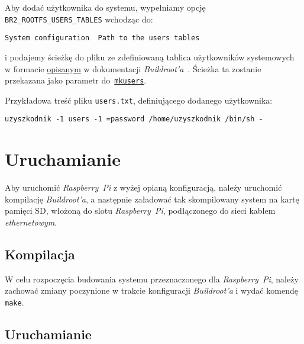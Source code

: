 \documentclass{article}
\begin{document}
Aby dodać użytkownika do systemu, wypełniamy opcję \texttt{BR2\_ROOTFS\_USERS\_TABLES} wchodząc do:

\begin{center}
\texttt{System configuration \textrightarrow\ Path to the users tables}
\end{center}

\noindent i podajemy ścieżkę do pliku ze zdefiniowaną tablica użytkowników systemowych w formacie \href{https://buildroot.org/downloads/manual/manual.html#makeuser-syntax}{opisanym} w dokumentacji \emph{Buildroot'a}~\cite{www:makeuser-syntax}. Ścieżka ta zostanie przekazana jako parametr do~\href{https://github.com/maximeh/buildroot/blob/master/support/scripts/mkusers}{\texttt{mkusers}}.

\noindent Przykładowa treść pliku \texttt{users.txt}, definiującego dodanego użytkownika:

\begin{Verbatim}[frame=single]
uzyszkodnik -1 users -1 =password /home/uzyszkodnik /bin/sh -
\end{Verbatim}


\section{Uruchamianie}

Aby uruchomić \emph{Raspberry~Pi} z wyżej opianą konfiguracją, należy uruchomić kompilację \emph{Buildroot'a}, a następnie załadować tak skompilowany system na kartę pamięci SD, włożoną do slotu \emph{Raspberry~Pi}, podłączonego do sieci kablem \emph{ethernetowym}.

\subsection{Kompilacja}

W celu rozpoczęcia budowania systemu przeznaczonego dla \emph{Raspberry~Pi}, należy zachować zmiany poczynione w trakcie konfiguracji \emph{Buildroot'a} i wydać komendę \texttt{make}.


\subsection{Uruchamianie}
\end{document}
